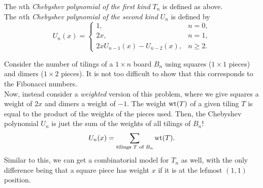 	\begin{fdef}
		The $n$th \emph{Chebyshev polynomial of the first kind} $T_n$ is defined as above.\\
		The $n$th \emph{Chebyshev polynomial of the second kind} $U_n$ is defined by
		\[ U_n(x) = \begin{cases} 1, & n=0, \\ 2x, & n=1, \\ 2xU_{n-1}(x) - U_{n-2}(x), & n \ge 2. \end{cases} \]
	\end{fdef}



	Consider the number of tilings of a $1\times n$ board $B_n$ using squares ($1\times 1$ pieces) and dimers ($1\times 2$ pieces). It is not too difficult to show that this corresponds to the Fibonacci numbers.\\
	Now, instead consider a \emph{weighted} version of this problem, where we give squares a weight of $2x$ and dimers a weight of $-1$. The weight $\operatorname{wt}(T)$ of a given tiling $T$ is equal to the product of the weights of the pieces used. Then, the Chebyshev polynomial $U_n$ is just the sum of the weights of all tilings of $B_n$!
	\[ U_n(x) = \sum_{\text{tilings $T$ of $B_n$}} \operatorname{wt}(T). \]
	Similar to this, we can get a combinatorial model for $T_n$ as well, with the only difference being that a square piece has weight $x$ if it is at the lefmost $(1,1)$ position.

